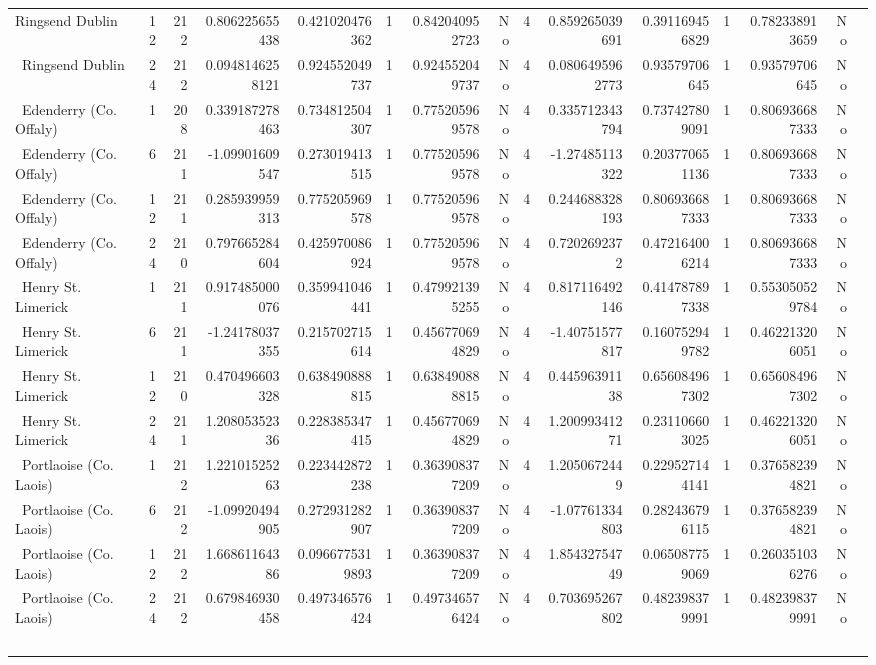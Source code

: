 \documentclass[10pt]{article}
\begin{document}
\begin{longtable}{@{}p{3.45cm}rrr rrrrr rrrrrr@{}}
Ringsend Dublin & 12 & 212 & 0.806225655438 & 0.421020476362 & 1 & 0.842040952723 & No & 4 & 0.859265039691 & 0.391169456829 & 1 & 0.782338913659 & No \\\
Ringsend Dublin & 24 & 212 & 0.0948146258121 & 0.924552049737 & 1 & 0.924552049737 & No & 4 & 0.0806495962773 & 0.93579706645 & 1 & 0.93579706645 & No \\\
Edenderry (Co. Offaly) & 1 & 208 & 0.339187278463 & 0.734812504307 & 1 & 0.775205969578 & No & 4 & 0.335712343794 & 0.737427809091 & 1 & 0.806936687333 & No \\\
Edenderry (Co. Offaly) & 6 & 211 & -1.09901609547 & 0.273019413515 & 1 & 0.775205969578 & No & 4 & -1.27485113322 & 0.203770651136 & 1 & 0.806936687333 & No \\\
Edenderry (Co. Offaly) & 12 & 211 & 0.285939959313 & 0.775205969578 & 1 & 0.775205969578 & No & 4 & 0.244688328193 & 0.806936687333 & 1 & 0.806936687333 & No \\\
Edenderry (Co. Offaly) & 24 & 210 & 0.797665284604 & 0.425970086924 & 1 & 0.775205969578 & No & 4 & 0.7202692372 & 0.472164006214 & 1 & 0.806936687333 & No \\\
Henry St. Limerick & 1 & 211 & 0.917485000076 & 0.359941046441 & 1 & 0.479921395255 & No & 4 & 0.817116492146 & 0.414787897338 & 1 & 0.553050529784 & No \\\
Henry St. Limerick & 6 & 211 & -1.24178037355 & 0.215702715614 & 1 & 0.456770694829 & No & 4 & -1.40751577817 & 0.160752949782 & 1 & 0.462213206051 & No \\\
Henry St. Limerick & 12 & 210 & 0.470496603328 & 0.638490888815 & 1 & 0.638490888815 & No & 4 & 0.44596391138 & 0.656084967302 & 1 & 0.656084967302 & No \\\
Henry St. Limerick & 24 & 211 & 1.20805352336 & 0.228385347415 & 1 & 0.456770694829 & No & 4 & 1.20099341271 & 0.231106603025 & 1 & 0.462213206051 & No \\\
Portlaoise (Co. Laois) & 1 & 212 & 1.22101525263 & 0.223442872238 & 1 & 0.363908377209 & No & 4 & 1.2050672449 & 0.229527144141 & 1 & 0.376582394821 & No \\\
Portlaoise (Co. Laois) & 6 & 212 & -1.09920494905 & 0.272931282907 & 1 & 0.363908377209 & No & 4 & -1.07761334803 & 0.282436796115 & 1 & 0.376582394821 & No \\\
Portlaoise (Co. Laois) & 12 & 212 & 1.66861164386 & 0.0966775319893 & 1 & 0.363908377209 & No & 4 & 1.85432754749 & 0.065087759069 & 1 & 0.260351036276 & No \\\
Portlaoise (Co. Laois) & 24 & 212 & 0.679846930458 & 0.497346576424 & 1 & 0.497346576424 & No & 4 & 0.703695267802 & 0.482398379991 & 1 & 0.482398379991 & No \\\
\end{longtable}
\end{document}
